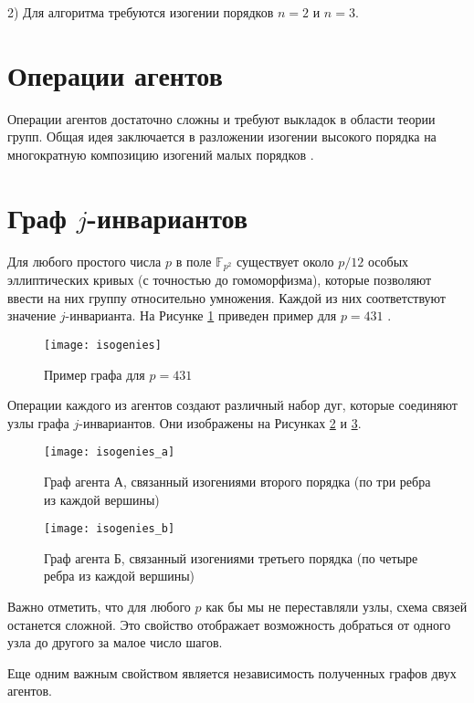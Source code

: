 2) Для алгоритма требуются изогении порядков $n = 2$ и $n = 3$.

\section{Операции агентов}

Операции агентов достаточно сложны и требуют выкладок в области теории групп. Общая идея заключается в разложении изогении высокого порядка на многократную композицию изогений малых порядков \cite{isogenies}.

\section{Граф $j$-инвариантов}

Для любого простого числа $p$ в поле $\mathds{F}_{p^2}$ существует около $p/12$ особых эллиптических кривых (с точностью до гомоморфизма), которые позволяют ввести на них группу относительно умножения. Каждой из них соответствуют значение $j$-инварианта. На Рисунке \ref{fig:isogenies} приведен пример для $p = 431$ \cite{isogenies}.

\begin{figure}[ht]
	\centering
	\texttt{[image: isogenies]}
	\caption{Пример графа для $p=431$}
	\label{fig:isogenies}
\end{figure}

Операции каждого из агентов создают различный набор дуг, которые соединяют узлы графа $j$-инвариантов. Они изображены на Рисунках \ref{fig:isogenies_a} и \ref{fig:isogenies_b}.

\begin{figure}[ht]
	\centering
	\texttt{[image: isogenies\_a]}
	\caption{Граф агента А, связанный изогениями второго порядка (по три ребра из каждой вершины)}
	\label{fig:isogenies_a}
\end{figure}

\begin{figure}[ht]
	\centering
	\texttt{[image: isogenies\_b]}
	\caption{Граф агента Б, связанный изогениями третьего порядка (по четыре ребра из каждой вершины)}
	\label{fig:isogenies_b}
\end{figure}

Важно отметить, что для любого $p$ как бы мы не переставляли узлы, схема связей останется сложной. Это свойство отображает возможность добраться от одного узла до другого за малое число шагов.

Еще одним важным свойством является независимость полученных графов двух агентов.

